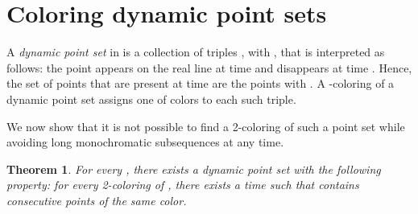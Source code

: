 \documentclass[11pt,a4paper]{amsart}
\theoremstyle{plain}
\newtheorem{theorem}{Theorem}[section]
\theoremstyle{definition}
\begin{document}
\section{Coloring dynamic point sets}
\label{sec:imposs}

A {\em dynamic point set}  in  is a collection of triples , with , that is interpreted as follows: the point  appears on the real line at time  and disappears at time . Hence, the set  of points that are present at time  are the points  with . A -coloring of a dynamic point set assigns one of  colors to each such triple.

We now show that it is not possible to find a 2-coloring of such a point set while avoiding long monochromatic subsequences at any time.

\begin{theorem}
\label{thm:imposs}
For every , there exists a dynamic point set  with the following property: for every 2-coloring of , there exists a time  such that  contains  consecutive points of the same color.  
\end{theorem}
\end{document}

